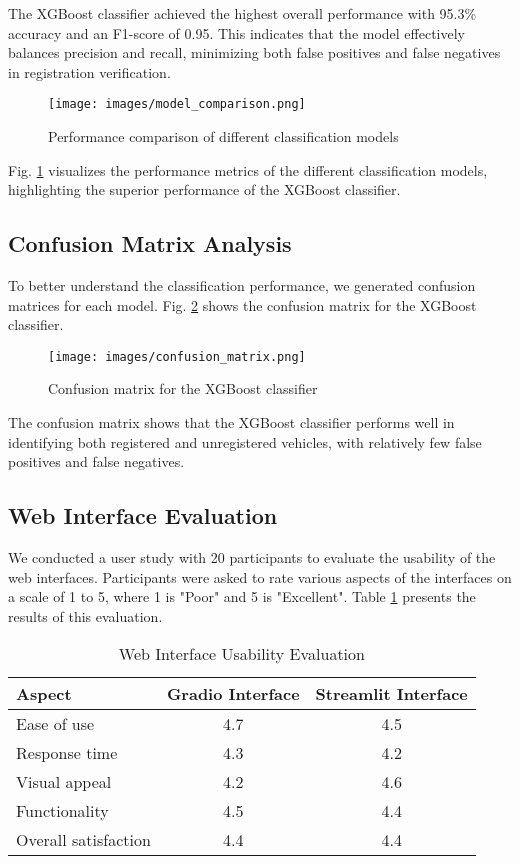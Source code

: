 \documentclass[conference]{IEEEtran}
\begin{document}
The XGBoost classifier achieved the highest overall performance with 95.3\% accuracy and an F1-score of 0.95. This indicates that the model effectively balances precision and recall, minimizing both false positives and false negatives in registration verification.

\begin{figure}[h]
\centering
\texttt{[image: images/model\_comparison.png]}
\caption{Performance comparison of different classification models}
\label{fig:model_comparison}
\end{figure}

Fig. \ref{fig:model_comparison} visualizes the performance metrics of the different classification models, highlighting the superior performance of the XGBoost classifier.

\subsection{Confusion Matrix Analysis}
To better understand the classification performance, we generated confusion matrices for each model. Fig. \ref{fig:confusion_matrix} shows the confusion matrix for the XGBoost classifier.

\begin{figure}[h]
\centering
\texttt{[image: images/confusion\_matrix.png]}
\caption{Confusion matrix for the XGBoost classifier}
\label{fig:confusion_matrix}
\end{figure}

The confusion matrix shows that the XGBoost classifier performs well in identifying both registered and unregistered vehicles, with relatively few false positives and false negatives.

\subsection{Web Interface Evaluation}
We conducted a user study with 20 participants to evaluate the usability of the web interfaces. Participants were asked to rate various aspects of the interfaces on a scale of 1 to 5, where 1 is "Poor" and 5 is "Excellent". Table \ref{tab:interface_evaluation} presents the results of this evaluation.

\begin{table}[h]
\caption{Web Interface Usability Evaluation}
\label{tab:interface_evaluation}
\centering
\begin{tabular}{|l|c|c|}
\hline
\textbf{Aspect} & \textbf{Gradio Interface} & \textbf{Streamlit Interface} \\
\hline
Ease of use & 4.7 & 4.5 \\
\hline
Response time & 4.3 & 4.2 \\
\hline
Visual appeal & 4.2 & 4.6 \\
\hline
Functionality & 4.5 & 4.4 \\
\hline
Overall satisfaction & 4.4 & 4.4 \\
\hline
\end{tabular}
\end{table}
\end{document}
